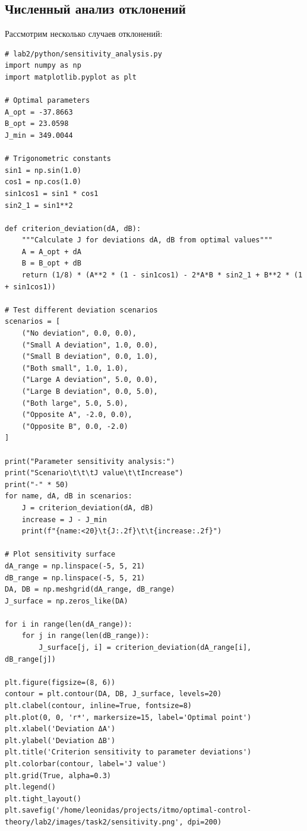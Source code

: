 \subsection{Численный анализ отклонений}
Рассмотрим несколько случаев отклонений:

\begin{lstlisting}[caption={Sensitivity analysis: criterion vs parameter deviations},label={lst:sensitivity}]
# lab2/python/sensitivity_analysis.py
import numpy as np
import matplotlib.pyplot as plt

# Optimal parameters
A_opt = -37.8663
B_opt = 23.0598
J_min = 349.0044

# Trigonometric constants
sin1 = np.sin(1.0)
cos1 = np.cos(1.0)
sin1cos1 = sin1 * cos1
sin2_1 = sin1**2

def criterion_deviation(dA, dB):
    """Calculate J for deviations dA, dB from optimal values"""
    A = A_opt + dA
    B = B_opt + dB
    return (1/8) * (A**2 * (1 - sin1cos1) - 2*A*B * sin2_1 + B**2 * (1 + sin1cos1))

# Test different deviation scenarios
scenarios = [
    ("No deviation", 0.0, 0.0),
    ("Small A deviation", 1.0, 0.0),
    ("Small B deviation", 0.0, 1.0),
    ("Both small", 1.0, 1.0),
    ("Large A deviation", 5.0, 0.0),
    ("Large B deviation", 0.0, 5.0),
    ("Both large", 5.0, 5.0),
    ("Opposite A", -2.0, 0.0),
    ("Opposite B", 0.0, -2.0)
]

print("Parameter sensitivity analysis:")
print("Scenario\t\t\tJ value\t\tIncrease")
print("-" * 50)
for name, dA, dB in scenarios:
    J = criterion_deviation(dA, dB)
    increase = J - J_min
    print(f"{name:<20}\t{J:.2f}\t\t{increase:.2f}")

# Plot sensitivity surface
dA_range = np.linspace(-5, 5, 21)
dB_range = np.linspace(-5, 5, 21)
DA, DB = np.meshgrid(dA_range, dB_range)
J_surface = np.zeros_like(DA)

for i in range(len(dA_range)):
    for j in range(len(dB_range)):
        J_surface[j, i] = criterion_deviation(dA_range[i], dB_range[j])

plt.figure(figsize=(8, 6))
contour = plt.contour(DA, DB, J_surface, levels=20)
plt.clabel(contour, inline=True, fontsize=8)
plt.plot(0, 0, 'r*', markersize=15, label='Optimal point')
plt.xlabel('Deviation ΔA')
plt.ylabel('Deviation ΔB')
plt.title('Criterion sensitivity to parameter deviations')
plt.colorbar(contour, label='J value')
plt.grid(True, alpha=0.3)
plt.legend()
plt.tight_layout()
plt.savefig('/home/leonidas/projects/itmo/optimal-control-theory/lab2/images/task2/sensitivity.png', dpi=200)
\end{lstlisting}


